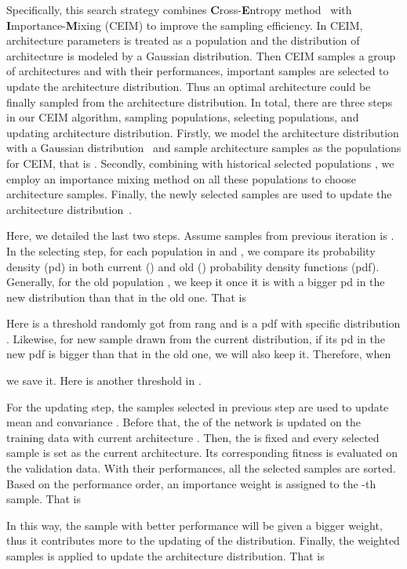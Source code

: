 \documentclass[letterpaper]{article} \usepackage{aaai19}  \usepackage{times}  \usepackage{helvet} \usepackage{courier}  \usepackage[hyphens]{url}  \usepackage{graphicx} \urlstyle{rm} \def\UrlFont{\rm}  \usepackage{graphicx}  \frenchspacing  \setlength{\pdfpagewidth}{8.5in}  \setlength{\pdfpageheight}{11in}
\begin{document}
Specifically, this search strategy combines \textbf{C}ross-\textbf{E}ntropy method~\cite{larranaga2001estimation} with \textbf{I}mportance-\textbf{M}ixing (CEIM) to improve the sampling efficiency. In CEIM, architecture parameters  is treated as a population and the distribution of architecture is modeled by a Gaussian distribution. Then CEIM samples a group of architectures and with their performances, important samples are selected to update the architecture distribution. Thus an optimal architecture could be finally sampled from the architecture distribution. 
In total, there are three steps in our CEIM algorithm, sampling populations, selecting populations, and updating architecture distribution. Firstly, we model the architecture distribution with a Gaussian distribution~ and sample  architecture samples  as the populations for CEIM, that is . Secondly, combining  with historical selected populations , we employ an importance mixing method on all these populations to choose architecture samples. Finally, the newly selected samples are used to update the architecture distribution~. 

Here, we detailed the last two steps. Assume samples from previous iteration is . In the selecting step, for each population in  and , we compare its probability density (pd) in both current () and old () probability density functions (pdf). Generally, for the old population , we keep it once it is with a bigger pd in the new distribution than that in the old one. That is 

Here  is a threshold randomly got from rang  and  is a pdf with specific distribution . Likewise, for new sample  drawn from the current distribution, if its pd in the new pdf is bigger than that in the old one, we will also keep it. Therefore, when 

we save it. Here  is another threshold in .

For the updating step, the samples selected in previous step are used to update mean  and convariance . Before that, the  of the network is updated on the training data with current architecture . Then, the  is fixed and every selected sample is set as the current architecture. Its corresponding fitness is evaluated on the validation data. With their performances, all the selected samples are sorted. 
Based on the performance order, an importance weight  is assigned to the -th sample. That is 


\noindent In this way, the sample with better performance will be given a bigger weight, thus it contributes more to the updating of the distribution. Finally, the weighted samples is applied to update the architecture distribution. That is
\end{document}
